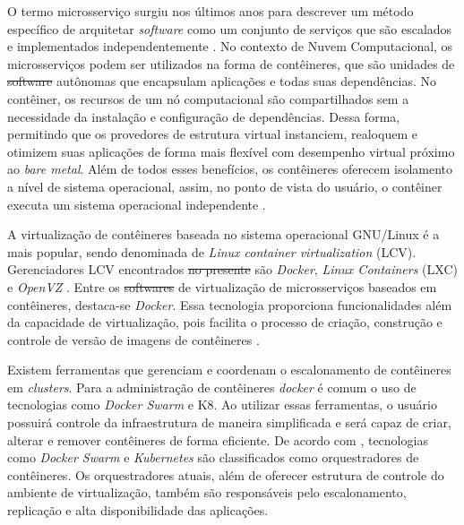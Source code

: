 \documentclass[
	12pt,				%
	openright,			%
	oneside,			%
	a4paper,			%
	brazil				%
	]{abntex2}
\providecommand{\DIFaddtex}[1]{{\protect\color{blue}\uwave{#1}}} %
\providecommand{\DIFdeltex}[1]{{\protect\color{red}\sout{#1}}}                      %
\providecommand{\DIFaddbegin}{} %
\providecommand{\DIFaddend}{} %
\providecommand{\DIFdelbegin}{} %
\providecommand{\DIFdelend}{} %
\providecommand{\DIFadd}[1]{\texorpdfstring{\DIFaddtex{#1}}{#1}} %
\providecommand{\DIFdel}[1]{\texorpdfstring{\DIFdeltex{#1}}{}} %
\newcommand{\DIFscaledelfig}{0.5}
\newlength{\DIFdelgraphicswidth} %
\newlength{\DIFdelgraphicsheight} %
\newcommand{\DIFaddincludegraphics}[2][]{{\color{blue}\fbox{\DIFOincludegraphics[#1]{#2}}}} %
\newcommand{\DIFdelincludegraphics}[2][]{%
\sbox{\DIFdelgraphicsbox}{\DIFOincludegraphics[#1]{#2}}%
\settoboxwidth{\DIFdelgraphicswidth}{\DIFdelgraphicsbox} %
\settoboxtotalheight{\DIFdelgraphicsheight}{\DIFdelgraphicsbox} %
\scalebox{\DIFscaledelfig}{%
\parbox[b]{\DIFdelgraphicswidth}{\usebox{\DIFdelgraphicsbox}\\[-\baselineskip] \rule{\DIFdelgraphicswidth}{0em}}\llap{\resizebox{\DIFdelgraphicswidth}{\DIFdelgraphicsheight}{%
\setlength{\unitlength}{\DIFdelgraphicswidth}%
\begin{picture}(1,1)%
\thicklines\linethickness{2pt} %
{\color[rgb]{1,0,0}\put(0,0){\framebox(1,1){}}}%
{\color[rgb]{1,0,0}\put(0,0){\line( 1,1){1}}}%
{\color[rgb]{1,0,0}\put(0,1){\line(1,-1){1}}}%
\end{picture}%
}\hspace*{3pt}}} %
} %
\DeclareRobustCommand{\DIFaddbegin}{\DIFOaddbegin \let\includegraphics\DIFaddincludegraphics} %
\DeclareRobustCommand{\DIFaddend}{\DIFOaddend \let\includegraphics\DIFOincludegraphics} %
\DeclareRobustCommand{\DIFdelbegin}{\DIFOdelbegin \let\includegraphics\DIFdelincludegraphics} %
\DeclareRobustCommand{\DIFdelend}{\DIFOaddend \let\includegraphics\DIFOincludegraphics} %
\begin{document}
O termo microsserviço surgiu nos últimos anos para descrever um método específico de arquitetar \textit{software} como um conjunto de serviços que são escalados e implementados independentemente \cite{FowlerMicrosservice}. No contexto de Nuvem Computacional, os microsserviços podem ser utilizados na forma de contêineres, que são unidades de \DIFdelbegin \DIFdel{software }\DIFdelend \DIFaddbegin \textit{\DIFadd{software}} \DIFaddend autônomas que encapsulam aplicações e todas suas dependências. No contêiner, os recursos de um nó computacional são compartilhados sem a necessidade da instalação e configuração de dependências. Dessa forma, permitindo que os provedores de estrutura virtual instanciem, realoquem e otimizem suas aplicações de forma mais flexível com desempenho virtual próximo ao \textit{bare metal}. Além de todos esses benefícios, os contêineres oferecem isolamento a nível de sistema operacional, assim, no ponto de vista do usuário, o contêiner executa um sistema operacional independente \cite{Fazio2016, Assuno}. 

A virtualização de contêineres baseada no sistema operacional GNU/Linux é a mais popular, sendo denominada de \textit{Linux container virtualization} (LCV). Gerenciadores LCV encontrados \DIFdelbegin \DIFdel{no presente }\DIFdelend \DIFaddbegin \DIFadd{na atualidade }\DIFaddend são \textit{Docker}, \textit{Linux Containers} (LXC) e \textit{OpenVZ} \cite{Fazio2016}. Entre os \DIFdelbegin \DIFdel{softwares }\DIFdelend \DIFaddbegin \textit{\DIFadd{softwares}} \DIFaddend de virtualização de microsserviços baseados em contêineres, destaca-se \textit{Docker}. Essa tecnologia proporciona funcionalidades além da capacidade de virtualização, pois facilita o processo de criação, construção e controle de versão de imagens de contêineres \cite{Redhat}.
\DIFdelbegin %

\DIFdelend %
Existem ferramentas que gerenciam e coordenam o escalonamento de contêineres em \textit{clusters}. Para a administração de contêineres \textit{docker} é comum o uso de tecnologias como \textit{Docker Swarm} e \ac{K8}. Ao utilizar essas ferramentas, o usuário possuirá controle da infraestrutura de maneira simplificada e será capaz de criar, alterar e remover contêineres de forma eficiente. De acordo com , tecnologias como \textit{Docker Swarm} e \textit{Kubernetes} são classificados como orquestradores de contêineres. Os orquestradores atuais, além de oferecer estrutura de controle do ambiente de virtualização, também são responsáveis pelo escalonamento, replicação e alta disponibilidade das aplicações. 
\end{document}
